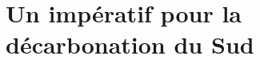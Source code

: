 \documentclass[a5paper,french,openany]{memoir}
\begin{document}


\section{Un impératif pour la décarbonation du Sud}
\end{document}
